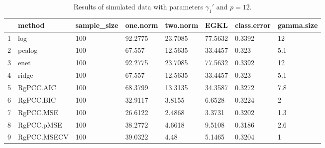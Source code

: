 \begin{table}[ht]
\centering
\begin{tabular}{rlllllll}
  \hline
 & method & sample\_size & one.norm & two.norm & EGKL & class.error & gamma.size \\ 
  \hline
1 & log & 100 & 92.2775 & 23.7085 & 77.5632 & 0.3392 & 12 \\ 
  2 & pcalog & 100 & 67.557 & 12.5635 & 33.4457 & 0.323 & 5.1 \\ 
  3 & enet & 100 & 92.2775 & 23.7085 & 77.5632 & 0.3392 & 12 \\ 
  4 & ridge & 100 & 67.557 & 12.5635 & 33.4457 & 0.323 & 5.1 \\ 
  5 & RgPCC.AIC & 100 & 68.3799 & 13.3135 & 34.3587 & 0.3272 & 7.8 \\ 
  6 & RgPCC.BIC & 100 & 32.9117 & 3.8155 & 6.6528 & 0.3224 & 2 \\ 
  7 & RgPCC.MSE & 100 & 26.6122 & 2.4868 & 3.3731 & 0.3202 & 1.3 \\ 
  8 & RgPCC.pMSE & 100 & 38.2772 & 4.6618 & 9.5108 & 0.3186 & 2.6 \\ 
  9 & RgPCC.MSECV & 100 & 39.0322 & 4.48 & 5.1465 & 0.3204 & 1 \\ 
   \hline
\end{tabular}
\caption{Results of simulated data with parameters $\gamma_1'$ and $p =12$. } 
\label{fig-1'-nonlead-alt-new-algo-12-metrics-p}
\end{table}
